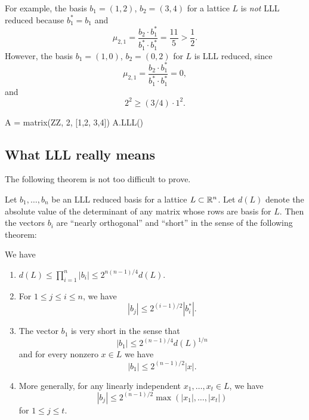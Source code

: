 For example, the basis $b_1 = (1,2)$, $b_2 = (3,4)$ for a lattice $L$
 is {\em not}
LLL reduced because $b_1^*=b_1$ and
$$
	\mu_{2,1} = \frac{b_2 \cdot b_1^*}{b_1^* \cdot b_1^*}
	= \frac{11}{5} > \frac{1}{2}.
$$
However, the basis $b_1 = (1,0)$, $b_2 = (0,2)$ for $L$ is
LLL reduced, since
$$
	\mu_{2,1} = \frac{b_2 \cdot b_1^*}{b_1^* \cdot b_1^*}
	= 0,
$$
and
$$
	2^2 \geq (3/4) \cdot 1^2.
$$
\begin{sagecode}
\begin{sagecell}
A = matrix(ZZ, 2, [1,2, 3,4])
A.LLL()
\end{sagecell}
\begin{sageout}
[1 0]
[0 2]
\end{sageout}
\end{sagecode}

\subsection{What LLL really means}
The following theorem is not too difficult to prove.

Let $b_1, \ldots, b_n$ be an LLL reduced basis
for a lattice $L\subset \mathbb{R}^n$.  Let $d(L)$ denote
the absolute value of the determinant of any matrix
whose rows are basis for $L$.   Then the vectors
$b_i$ are ``nearly orthogonal'' and ``short'' in
the sense of the following theorem:
\begin{theorem}
	We have
	\begin{enumerate}
		\item
			$d(L) \leq \prod_{i=1}^n |b_i| \leq 2^{n(n-1)/4} d(L)$.
		\item
			For $1\leq j \leq i \leq n$, we have
			$$
				|b_j| \leq 2^{(i-1)/2} |b_i^*|.
			$$
		\item
			The vector $b_1$ is very short in the sense that
			$$
				|b_1| \leq 2^{(n-1)/4} d(L)^{1/n}
			$$
			and for every nonzero $x \in L$ we have
			$$
				|b_1| \leq 2^{(n-1)/2} |x|.
			$$
		\item
			More generally, for any linearly independent
			$x_1,\ldots, x_t \in L$, we have
			$$
				|b_j| \leq 2^{(n-1)/2} \max(|x_1|, \ldots, |x_t|)
			$$
			for $1\leq j \leq t$.
	\end{enumerate}
\end{theorem}

